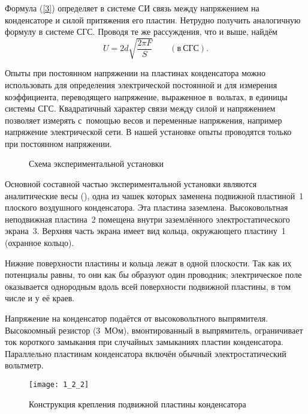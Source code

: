 Формула (\eqref{3}) определяет в системе СИ связь между напряжением на конденсаторе и силой притяжения его пластин. Нетрудно
получить аналогичную формулу в системе СГС. Проводя те же рассуждения, что и выше, найдём
\begin{equation}
	U=2d\sqrt{\frac{2\pi F}{S}}\qquad(в~СГС).
\end{equation}

Опыты при постоянном напряжении на пластинах конденсатора можно использовать для определения электрической постоянной и
для измерения коэффициента, переводящего напряжение, выраженное в~вольтах, в единицы системы СГС. Квадратичный характер
связи между силой и напряжением позволяет измерять с~помощью весов и переменные напряжения, например напряжение
электрической сети. В нашей установке опыты проводятся только при постоянном напряжении.

\begin{figure}
	\caption{Схема экспериментальной установки}
\end{figure}

\experiment Основной составной частью экспериментальной установки являются аналитические весы (), одна из чашек которых
заменена подвижной пластиной~1 плоского воздушного конденсатора. Эта пластина заземлена. Высоковольтная неподвижная
пластина~2 помещена внутри заземлённого электростатического экрана~3. Верхняя часть экрана имеет вид кольца, окружающего
пластину~1 (охранное кольцо).

Нижние поверхности пластины и кольца лежат в одной плоскости. Так как их потенциалы равны, то они как бы образуют один
проводник; электрическое поле оказывается однородным вдоль всей поверхности подвижной пластины, в том числе и у её краев.

Напряжение на конденсатор подаётся от высоковольтного выпрямителя. Высокоомный резистор (3~МОм), вмонтированный в
выпрямитель, ограничивает ток короткого замыкания при случайных замыканиях пластин конденсатора. Параллельно пластинам
конденсатора включён обычный электростатический вольтметр.

\begin{wrapfigure}{r}{0.4\textwidth}
	\texttt{[image: 1\_2\_2]}
	\caption{Конструкция крепления подвижной пластины конденсатора}
\end{wrapfigure}

